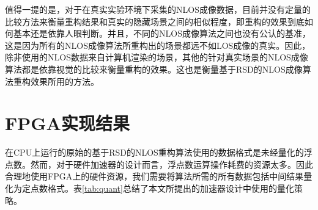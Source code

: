 \documentclass[master]{shtthesis}             %
\begin{document}
值得一提的是，对于在真实实验环境下采集的NLOS成像数据，目前并没有定量的比较方法来衡量重构结果和真实的隐藏场景之间的相似程度，即重构的效果到底如何基本还是依靠人眼判断。并且，不同的NLOS成像算法之间也没有公认的基准，这是因为所有的NLOS成像算法所重构出的场景都远不如LOS成像的真实。因此，除非使用的NLOS数据来自计算机渲染的场景，其他的针对真实场景的NLOS成像算法都是依靠视觉的比较来衡量重构的效果。这也是衡量基于RSD的NLOS成像算法重构效果所用的方法\citep{Liu,Liu2019}。

\section{FPGA实现结果}

在CPU上运行的原始的基于RSD的NLOS重构算法使用的数据格式是未经量化的浮点数。然而，对于硬件加速器的设计而言，浮点数运算操作耗费的资源太多。因此合理地使用FPGA上的硬件资源，我们需要将算法所需的所有数据包括中间结果量化为定点数格式。表\ref{tab:quant}总结了本文所提出的加速器设计中使用的量化策略。

\begin{table}[!t]
    \centering
    \label{tab:quant}
\end{table}
\end{document}
